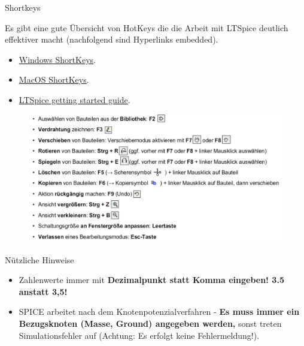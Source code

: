 \documentclass{beamer}
\begin{document}
\begin{frame}[t]{Shortkeys}
	
Es gibt eine gute Übersicht von HotKeys die die Arbeit mit LTSpice deutlich effektiver macht (nachfolgend sind Hyperlinks embedded).

\begin{itemize}
  \item \href{https://www.analog.com/media/en/simulation-models/spice-models/LTspice_ShortcutFlyer.pdf?modelType=spice-models}{Windows ShortKeys}.
  \item \href{https://www.analog.com/media/en/simulation-models/spice-models/LTspiceShortcutsForMacOSX.pdf?modelType=spice-models}{MacOS ShortKeys}.
  \item \href{https://www.analog.com/media/en/simulation-models/spice-models/LTspiceGettingStartedGuide.pdf?modelType=spice-models}{LTSpice getting started guide}.
\end{itemize}

\begin{figure}
  \centering
  \includegraphics[scale=0.25]{pictures/shortkeys.png}
\end{figure}

\end{frame}

\begin{frame}[t]{Nützliche Hinweise}

  \begin{itemize}
    \item Zahlenwerte immer mit \textbf{Dezimalpunkt statt Komma eingeben! 3.5 anstatt 3,5!}
    \item SPICE arbeitet nach dem Knotenpotenzialverfahren - \textbf{Es muss immer ein Bezugsknoten
          (Masse, Ground) angegeben werden,} sonst treten Simulationsfehler auf (Achtung: Es erfolgt
          keine Fehlermeldung!).
  \end{itemize}

\end{frame}
  
\end{document}
